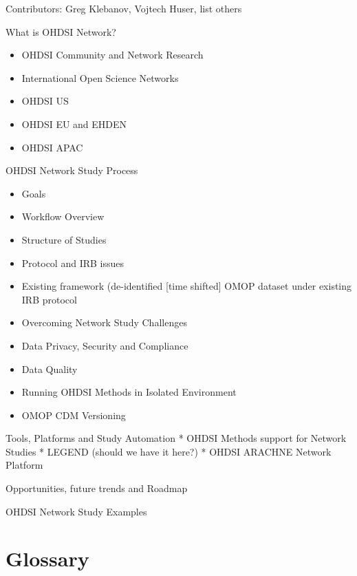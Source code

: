 \documentclass[]{book}
\providecommand{\tightlist}{%
  \setlength{\itemsep}{0pt}\setlength{\parskip}{0pt}}
\begin{document}
Contributors: Greg Klebanov, Vojtech Huser, list others

What is OHDSI Network?

\begin{itemize}
\tightlist
\item
  OHDSI Community and Network Research
\item
  International Open Science Networks
\item
  OHDSI US
\item
  OHDSI EU and EHDEN
\item
  OHDSI APAC
\end{itemize}

OHDSI Network Study Process

\begin{itemize}
\tightlist
\item
  Goals
\item
  Workflow Overview
\item
  Structure of Studies
\item
  Protocol and IRB issues
\item
  Existing framework (de-identified {[}time shifted{]} OMOP dataset
  under existing IRB protocol
\item
  Overcoming Network Study Challenges
\item
  Data Privacy, Security and Compliance
\item
  Data Quality
\item
  Running OHDSI Methods in Isolated Environment
\item
  OMOP CDM Versioning
\end{itemize}

Tools, Platforms and Study Automation * OHDSI Methods support for
Network Studies * LEGEND (should we have it here?) * OHDSI ARACHNE
Network Platform

Opportunities, future trends and Roadmap

OHDSI Network Study Examples

\appendix


\chapter{Glossary}\label{Glossary}


\end{document}
